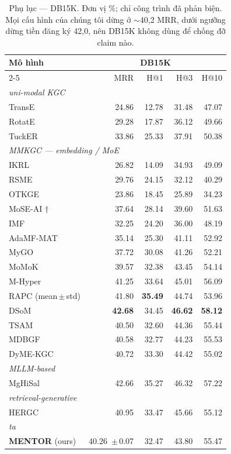 \begin{table}[t]
\centering
\footnotesize
\setlength{\tabcolsep}{5pt}
\caption{Phụ lục --- DB15K. Đơn vị \%; chỉ công trình đã phản biện. Mọi cấu hình của chúng tôi dừng ở $\sim$40{,}2 MRR, dưới ngưỡng dừng tiền đăng ký 42{,}0, nên DB15K không dùng để chống đỡ claim nào.}
\label{tab:db15k}
\begin{tabular}{l r r r r}
\toprule
\multirow{2}{*}{Mô hình} & \multicolumn{4}{c}{DB15K} \\
\cmidrule(lr){2-5}
 & MRR & H@1 & H@3 & H@10 \\
\midrule
\multicolumn{5}{l}{\itshape uni-modal KGC} \\
TransE & 24.86 & 12.78 & 31.48 & 47.07 \\
RotatE & 29.28 & 17.87 & 36.12 & 49.66 \\
TuckER & 33.86 & 25.33 & 37.91 & 50.38 \\
\multicolumn{5}{l}{\itshape MMKGC — embedding / MoE} \\
IKRL & 26.82 & 14.09 & 34.93 & 49.09 \\
RSME & 29.76 & 24.15 & 32.12 & 40.29 \\
OTKGE & 23.86 & 18.45 & 25.89 & 34.23 \\
MoSE-AI † & 37.64 & 28.14 & 39.60 & 51.63 \\
IMF & 32.25 & 24.20 & 36.00 & 48.19 \\
AdaMF-MAT & 35.14 & 25.30 & 41.11 & 52.92 \\
MyGO & 37.72 & 30.08 & 41.26 & 52.21 \\
MoMoK & 39.57 & 32.38 & 43.45 & 54.14 \\
M-Hyper & 41.25 & 33.64 & 45.01 & 56.09 \\
RAPC (mean\,$\pm$\,std) & 41.80 & \textbf{35.49} & 44.74 & 53.96 \\
DSoM & \textbf{42.68} & 34.45 & \textbf{46.62} & \textbf{58.12} \\
TSAM & 40.50 & 32.60 & 44.36 & 55.44 \\
MDBGF & 40.58 & 32.77 & 44.23 & 55.53 \\
DyME-KGC & 40.72 & 33.30 & 44.42 & 55.02 \\
\multicolumn{5}{l}{\itshape MLLM-based} \\
MgHiSal & 42.66 & 35.27 & 46.32 & 57.22 \\
\multicolumn{5}{l}{\itshape retrieval-generative} \\
HERGC & 40.95 & 33.47 & 45.66 & 55.12 \\
\multicolumn{5}{l}{\itshape ta} \\
\midrule
\textbf{MENTOR} (ours) & 40.26 \,$\pm$\,0.07 & 32.47 & 43.80 & 55.47 \\
\bottomrule
\end{tabular}
\end{table}
